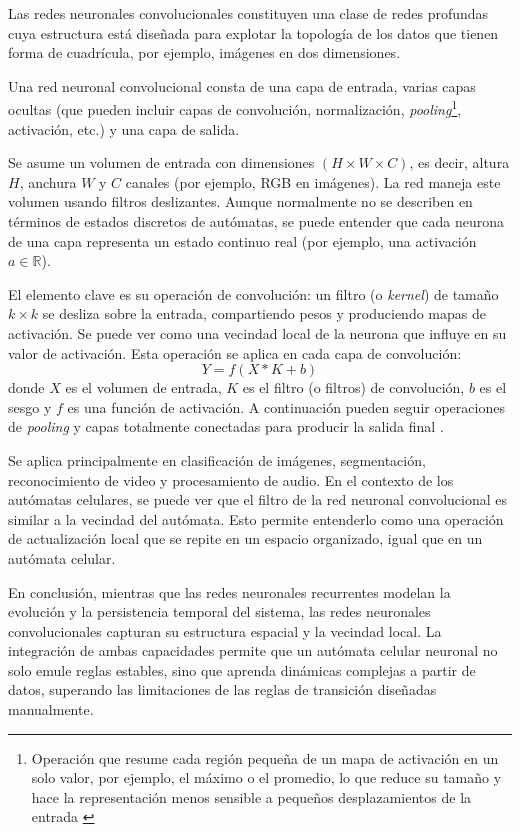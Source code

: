 Las redes neuronales convolucionales constituyen una clase de redes profundas cuya estructura está diseñada para explotar la topología de los datos que tienen forma de cuadrícula, por ejemplo, imágenes en dos dimensiones.

Una red neuronal convolucional consta de una capa de entrada, varias capas ocultas (que pueden incluir capas de convolución, normalización, \textit{pooling}\footnote{Operación que resume cada región pequeña de un mapa de activación en un solo valor, por ejemplo, el máximo o el promedio, lo que reduce su tamaño y hace la representación menos sensible a pequeños desplazamientos de la entrada \cite{goodfellow2016_dl}}, activación, etc.) y una capa de salida.

Se asume un volumen de entrada con dimensiones $(H \times W \times C)$, es decir, altura $H$, anchura $W$ y $C$ canales (por ejemplo, RGB en imágenes). La red maneja este volumen usando filtros deslizantes. Aunque normalmente no se describen en términos de estados discretos de autómatas, se puede entender que cada neurona de una capa representa un estado continuo real (por ejemplo, una activación $a \in \mathbb{R}$).

El elemento clave es su operación de convolución: un filtro (o \textit{kernel}) de tamaño $k \times k$ se desliza sobre la entrada, compartiendo pesos y produciendo mapas de activación. Se puede ver como una vecindad local de la neurona que influye en su valor de activación. Esta operación se aplica en cada capa de convolución:
\[
Y = f(X * K + b)
\]
donde $X$ es el volumen de entrada, $K$ es el filtro (o filtros) de convolución, $b$ es el sesgo y $f$ es una función de activación. A continuación pueden seguir operaciones de \textit{pooling} y capas totalmente conectadas para producir la salida final \cite{amidi2025_cnn}.

Se aplica principalmente en clasificación de imágenes, segmentación, reconocimiento de video y procesamiento de audio. En el contexto de los autómatas celulares, se puede ver que el filtro de la red neuronal convolucional es similar a la vecindad del autómata. Esto permite entenderlo como una operación de actualización local que se repite en un espacio organizado, igual que en un autómata celular.

En conclusión, mientras que las redes neuronales recurrentes modelan la evolución y la persistencia temporal del sistema, las redes neuronales convolucionales capturan su estructura espacial y la vecindad local. La integración de ambas capacidades permite que un autómata celular neuronal no solo emule reglas estables, sino que aprenda dinámicas complejas a partir de datos, superando las limitaciones de las reglas de transición diseñadas manualmente.

\clearpage
